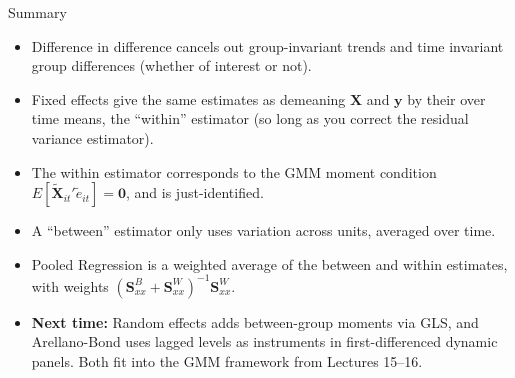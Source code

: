 \documentclass[aspectratio=169, handout]{beamer}
\numberwithin{equation}{section}
\begin{document}
\begin{frame}{Summary}
\begin{itemize}
\item Difference in difference cancels out group-invariant trends and time invariant group differences (whether of interest or not).
\item Fixed effects give the same estimates as demeaning $\bm{X}$ and $\bm{y}$ by their over time means, the ``within'' estimator (so long as you correct the residual variance estimator).
\item The within estimator corresponds to the GMM moment condition $E[\tilde{\bm{X}}_{it}'\tilde{e}_{it}]=\bm{0}$, and is just-identified.
\item A ``between'' estimator only uses variation across units, averaged over time.
\item Pooled Regression is a weighted average of the between and within estimates, with weights $(\bm{S}^B_{xx}+\bm{S}^W_{xx})^{-1}\bm{S}^{W}_{xx}$.
\item \textbf{Next time:} Random effects adds between-group moments via GLS, and Arellano-Bond uses lagged levels as instruments in first-differenced dynamic panels. Both fit into the GMM framework from Lectures 15--16.
\end{itemize}
\end{frame}
\end{document}
